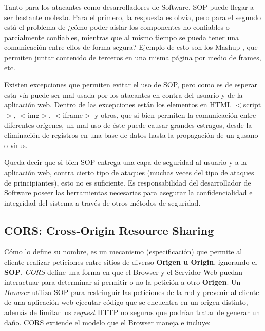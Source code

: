     
    Tanto para los atacantes como desarrolladores de Software, SOP puede llegar a ser bastante molesto. Para el primero, la respuesta es obvia, pero para el segundo está el problema de ¿cómo poder aislar los componentes no confiables o parcialmente confiables, mientras que al mismo tiempo se pueda tener una comunicación entre ellos de forma segura? Ejemplo de esto son los Mashup \cite{barth2009securing}, que permiten juntar contenido de terceros en una misma página por medio de frames, etc. 
        
    Existen excepciones que permiten evitar el uso de SOP, pero como es de esperar esta vía puede ser mal usada por los atacantes en contra del usuario y de la aplicación web. Dentro de las excepciones están los elementos en HTML \(<\)script\(>\), \(<\)img\(>\), \(<\)iframe\(>\) y otros, que si bien permiten la comunicación entre diferentes orígenes, un mal uso de éste puede causar grandes estragos, desde la eliminación de registros en una base de datos hasta la propagación de un gusano o virus.
        
    Queda decir que si bien SOP entrega una capa de seguridad al usuario y a la aplicación web, contra cierto tipo de ataques (muchas veces del tipo de ataques de principiantes), esto no es suficiente. Es responsabilidad del desarrollador de Software poseer las herramientas necesarias para asegurar la confidencialidad e integridad del sistema a través de otros métodos de seguridad.



\subsection{CORS: Cross-Origin Resource Sharing}
\label{chap2:CORS}
    Cómo lo define su nombre, es un mecanismo (especificación) que permite al cliente realizar peticiones entre sitios de diverso \textbf{Origen u Origin}, ignorando el \textbf{SOP}. \textit{CORS} define una forma en que el Browser y el Servidor Web puedan interactuar para determinar si permitir o no la petición a otro \textbf{Origen}. Un \textit{Browser} utiliza SOP para restringuir las peticiones de la red y prevenir al cliente de una aplicación web ejecutar código que se encuentra en un origen distinto, además de limitar los \textit{request} HTTP no seguros que podrían tratar de generar un daño. CORS extiende el modelo que el Browser maneja e incluye:
        

